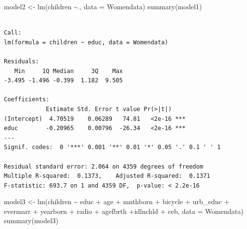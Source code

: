 \documentclass[
  letterpaper,
  DIV=11,
  numbers=noendperiod]{scrartcl}
\newenvironment{Shaded}{\begin{snugshade}}{\end{snugshade}}
\newcommand{\AttributeTok}[1]{\textcolor[rgb]{0.40,0.45,0.13}{#1}}
\newcommand{\FunctionTok}[1]{\textcolor[rgb]{0.28,0.35,0.67}{#1}}
\newcommand{\NormalTok}[1]{\textcolor[rgb]{0.00,0.23,0.31}{#1}}
\newcommand{\OtherTok}[1]{\textcolor[rgb]{0.00,0.23,0.31}{#1}}
\newcommand{\SpecialCharTok}[1]{\textcolor[rgb]{0.37,0.37,0.37}{#1}}
\begin{document}
\begin{Shaded}
\begin{Highlighting}[]
\NormalTok{model2 }\OtherTok{\textless{}{-}} \FunctionTok{lm}\NormalTok{(children }\SpecialCharTok{\textasciitilde{}}\NormalTok{., }\AttributeTok{data =}\NormalTok{ Womendata)}
\FunctionTok{summary}\NormalTok{(model1)}
\end{Highlighting}
\end{Shaded}

\begin{verbatim}

Call:
lm(formula = children ~ educ, data = Womendata)

Residuals:
   Min     1Q Median     3Q    Max 
-3.495 -1.496 -0.399  1.182  9.505 

Coefficients:
            Estimate Std. Error t value Pr(>|t|)    
(Intercept)  4.70519    0.06289   74.81   <2e-16 ***
educ        -0.20965    0.00796  -26.34   <2e-16 ***
---
Signif. codes:  0 '***' 0.001 '**' 0.01 '*' 0.05 '.' 0.1 ' ' 1

Residual standard error: 2.064 on 4359 degrees of freedom
Multiple R-squared:  0.1373,    Adjusted R-squared:  0.1371 
F-statistic: 693.7 on 1 and 4359 DF,  p-value: < 2.2e-16
\end{verbatim}

\begin{Shaded}
\begin{Highlighting}[]
\NormalTok{model3 }\OtherTok{\textless{}{-}} \FunctionTok{lm}\NormalTok{(children }\SpecialCharTok{\textasciitilde{}}\NormalTok{ educ }\SpecialCharTok{+}\NormalTok{ age }\SpecialCharTok{+}\NormalTok{ mnthborn }\SpecialCharTok{+}\NormalTok{ bicycle }\SpecialCharTok{+}\NormalTok{ urb\_educ }\SpecialCharTok{+}\NormalTok{ evermarr }\SpecialCharTok{+}\NormalTok{ yearborn }\SpecialCharTok{+}\NormalTok{ radio }\SpecialCharTok{+}\NormalTok{ agefbrth }\SpecialCharTok{+}\NormalTok{idlnchld }\SpecialCharTok{+}\NormalTok{ ceb, }\AttributeTok{data =}\NormalTok{ Womendata)}
\FunctionTok{summary}\NormalTok{(model3)}
\end{Highlighting}
\end{Shaded}
\end{document}
